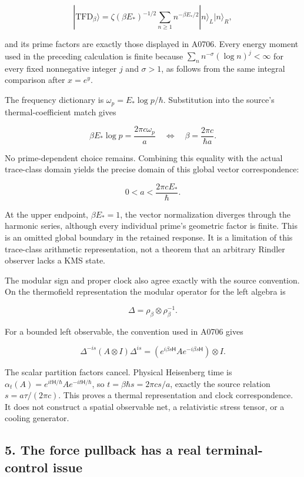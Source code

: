 \[
|\mathrm{TFD}_\beta\rangle
=\zeta(\beta E_*)^{-1/2}\sum_{n\ge1}n^{-\beta E_*/2}|n\rangle_L|n\rangle_R,
\]

and its prime factors are exactly those displayed in A0706. Every energy
moment used in the preceding calculation is finite because
\(\sum_n n^{-\sigma}(\log n)^j<\infty\) for every fixed nonnegative
integer \(j\) and \(\sigma>1\), as follows from the same integral
comparison after \(x=e^y\).

The frequency dictionary is \(\omega_p=E_*\log p/\hbar\). Substitution
into the source's thermal-coefficient match gives

\[
\beta E_*\log p=\frac{2\pi c\omega_p}{a}
\quad\Longleftrightarrow\quad
\beta=\frac{2\pi c}{\hbar a}.
\]

No prime-dependent choice remains. Combining this equality with the
actual trace-class domain yields the precise domain of this global
vector correspondence:

\[
0<a<\frac{2\pi cE_*}{\hbar}.
\]

At the upper endpoint, \(\beta E_*=1\), the vector normalization
diverges through the harmonic series, although every individual prime's
geometric factor is finite. This is an omitted global boundary in the
retained response. It is a limitation of this trace-class arithmetic
representation, not a theorem that an arbitrary Rindler observer lacks a
KMS state.

The modular sign and proper clock also agree exactly with the source
convention. On the thermofield representation the modular operator for
the left algebra is

\[
\Delta=\rho_\beta\otimes\rho_\beta^{-1}.
\]

For a bounded left observable, the convention used in A0706 gives

\[
\Delta^{-is}(A\otimes I)\Delta^{is}
=(e^{i\beta s\mathsf H}Ae^{-i\beta s\mathsf H})\otimes I.
\]

The scalar partition factors cancel. Physical Heisenberg time is
\(\alpha_t(A)=e^{it\mathsf H/\hbar}Ae^{-it\mathsf H/\hbar}\), so
\(t=\beta\hbar s=2\pi cs/a\), exactly the source relation
\(s=a\tau/(2\pi c)\). This proves a thermal representation and clock
correspondence. It does not construct a spatial observable net, a
relativistic stress tensor, or a cooling generator.

\subsection{5. The force pullback has a real terminal-control
issue}\label{proof10:the-force-pullback-has-a-real-terminal-control-issue}

